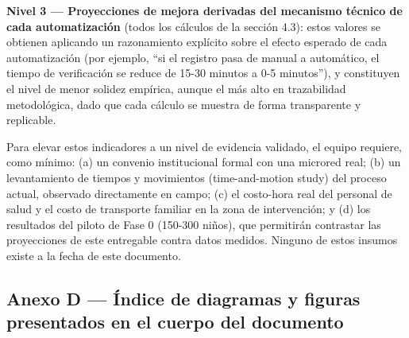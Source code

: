 \documentclass[11pt,a4paper]{article}
\begin{document}
\textbf{Nivel 3 --- Proyecciones de mejora derivadas del mecanismo técnico de cada automatización} (todos los cálculos de la sección 4.3): estos valores se obtienen aplicando un razonamiento explícito sobre el efecto esperado de cada automatización (por ejemplo, ``si el registro pasa de manual a automático, el tiempo de verificación se reduce de 15-30 minutos a 0-5 minutos''), y constituyen el nivel de menor solidez empírica, aunque el más alto en trazabilidad metodológica, dado que cada cálculo se muestra de forma transparente y replicable.

Para elevar estos indicadores a un nivel de evidencia validado, el equipo requiere, como mínimo: (a) un convenio institucional formal con una microred real; (b) un levantamiento de tiempos y movimientos (time-and-motion study) del proceso actual, observado directamente en campo; (c) el costo-hora real del personal de salud y el costo de transporte familiar en la zona de intervención; y (d) los resultados del piloto de Fase 0 (150-300 niños), que permitirán contrastar las proyecciones de este entregable contra datos medidos. Ninguno de estos insumos existe a la fecha de este documento.

\subsection{Anexo D --- Índice de diagramas y figuras presentados en el cuerpo del documento}\label{anexo-d-uxedndice-de-diagramas-y-figuras-presentados-en-el-cuerpo-del-documento}
\end{document}
